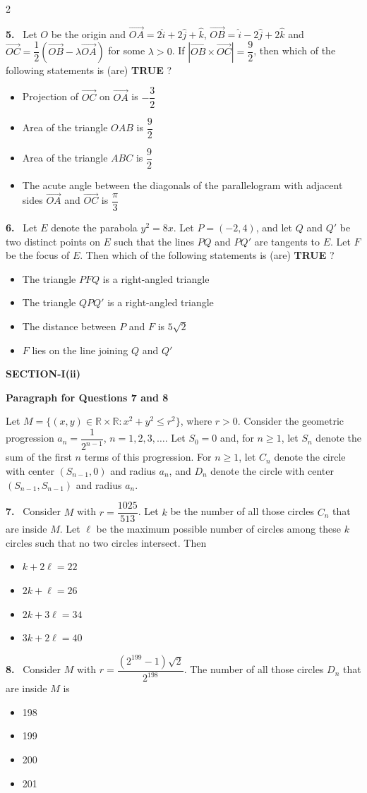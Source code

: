 \documentclass[10pt]{extarticle}
\newcommand{\sect}[1]{\par\smallskip\noindent\textbf{#1}\par}
\newcommand{\qn}[1]{\par\smallskip\noindent\textbf{#1.}~}
\newcommand{\paraq}[2]{\par\smallskip\noindent\textbf{Paragraph for Questions #1 and #2}\par}
\newenvironment{qoptions}{\begin{itemize}[leftmargin=1.8em,itemsep=1pt,topsep=2pt,label={}]}{\end{itemize}}
\newcommand{\opt}[2]{\item[(#1)] #2}
\begin{document}
\begin{multicols}{2}
\qn{5} Let $O$ be the origin and $\overrightarrow{OA}=2\hat i+2\hat j+\hat k$, $\overrightarrow{OB}=\hat i-2\hat j+2\hat k$ and $\overrightarrow{OC}=\dfrac12\left(\overrightarrow{OB}-\lambda\overrightarrow{OA}\right)$ for some $\lambda>0$. If $\left|\overrightarrow{OB}\times\overrightarrow{OC}\right|=\dfrac92$, then which of the following statements is (are) \textbf{TRUE} ?
\begin{qoptions}
\opt{A}{Projection of $\overrightarrow{OC}$ on $\overrightarrow{OA}$ is $-\dfrac32$}
\opt{B}{Area of the triangle $OAB$ is $\dfrac92$}
\opt{C}{Area of the triangle $ABC$ is $\dfrac92$}
\opt{D}{The acute angle between the diagonals of the parallelogram with adjacent sides $\overrightarrow{OA}$ and $\overrightarrow{OC}$ is $\dfrac\pi3$}
\end{qoptions}

\qn{6} Let $E$ denote the parabola $y^2=8x$. Let $P=(-2,4)$, and let $Q$ and $Q'$ be two distinct points on $E$ such that the lines $PQ$ and $PQ'$ are tangents to $E$. Let $F$ be the focus of $E$. Then which of the following statements is (are) \textbf{TRUE} ?
\begin{qoptions}
\opt{A}{The triangle $PFQ$ is a right-angled triangle}
\opt{B}{The triangle $QPQ'$ is a right-angled triangle}
\opt{C}{The distance between $P$ and $F$ is $5\sqrt2$}
\opt{D}{$F$ lies on the line joining $Q$ and $Q'$}
\end{qoptions}

\sect{SECTION-I(ii)}
\paraq{7}{8}
Let $M=\{(x,y)\in\mathbb R\times\mathbb R:x^2+y^2\le r^2\}$, where $r>0$. Consider the geometric progression $a_n=\dfrac1{2^{n-1}}$, $n=1,2,3,\dots$. Let $S_0=0$ and, for $n\ge1$, let $S_n$ denote the sum of the first $n$ terms of this progression. For $n\ge1$, let $C_n$ denote the circle with center $(S_{n-1},0)$ and radius $a_n$, and $D_n$ denote the circle with center $(S_{n-1},S_{n-1})$ and radius $a_n$.

\qn{7} Consider $M$ with $r=\dfrac{1025}{513}$. Let $k$ be the number of all those circles $C_n$ that are inside $M$. Let $\ell$ be the maximum possible number of circles among these $k$ circles such that no two circles intersect. Then
\begin{qoptions}
\opt{A}{$k+2\ell=22$}
\opt{B}{$2k+\ell=26$}
\opt{C}{$2k+3\ell=34$}
\opt{D}{$3k+2\ell=40$}
\end{qoptions}

\qn{8} Consider $M$ with $r=\dfrac{(2^{199}-1)\sqrt2}{2^{198}}$. The number of all those circles $D_n$ that are inside $M$ is
\begin{qoptions}
\opt{A}{198}
\opt{B}{199}
\opt{C}{200}
\opt{D}{201}
\end{qoptions}


\end{multicols}
\end{document}
